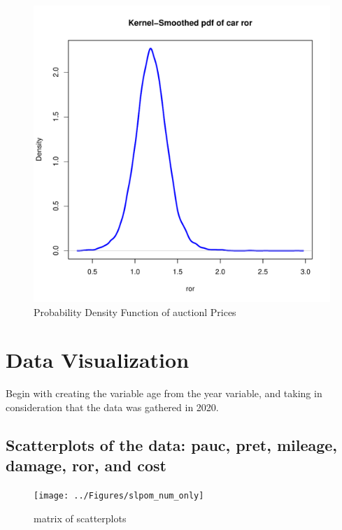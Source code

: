 \documentclass[11pt]{paper}
\begin{document}
\begin{figure}[h!]
  \centering
  \includegraphics[scale = 0.5, keepaspectratio=true]{../Figures/density_ror}
  \caption{Probability Density Function of auctionl Prices} \label{fig:density_ror}
\end{figure}

\clearpage




\section{Data Visualization}

Begin with creating the variable age from the year variable, and taking in consideration that the data was gathered in 2020.

\subsection{Scatterplots of the data: pauc, pret, mileage, damage, ror, and cost}
%
\begin{figure}[h!]
  \centering
  \texttt{[image: ../Figures/slpom\_num\_only]}
  \caption{matrix of scatterplots} \label{fig:splom_num_only}
\end{figure}
\clearpage
\end{document}
